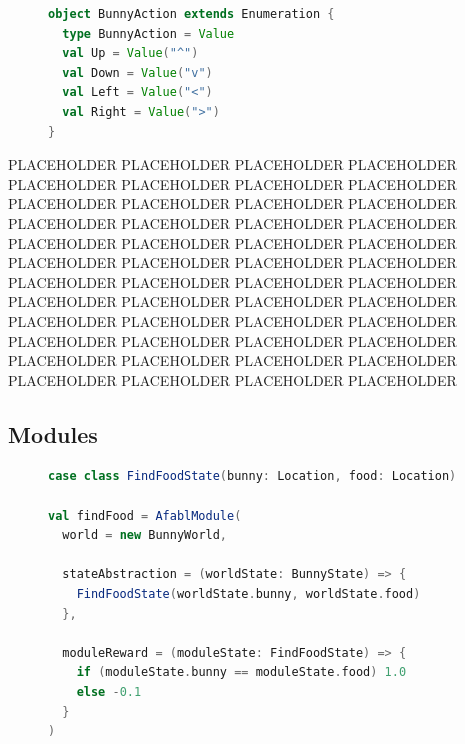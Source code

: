 \begin{figure}[ht]
\begin{center}

\begin{lstlisting}[language=Scala]
object BunnyAction extends Enumeration {
  type BunnyAction = Value
  val Up = Value("^")
  val Down = Value("v")
  val Left = Value("<")
  val Right = Value(">")
}
\end{lstlisting}

\caption{}
\end{center}
\label{fig:bunny-action-code}
\end{figure}


PLACEHOLDER PLACEHOLDER PLACEHOLDER PLACEHOLDER PLACEHOLDER PLACEHOLDER PLACEHOLDER PLACEHOLDER PLACEHOLDER PLACEHOLDER PLACEHOLDER PLACEHOLDER PLACEHOLDER PLACEHOLDER PLACEHOLDER PLACEHOLDER PLACEHOLDER PLACEHOLDER PLACEHOLDER PLACEHOLDER PLACEHOLDER PLACEHOLDER PLACEHOLDER PLACEHOLDER PLACEHOLDER PLACEHOLDER PLACEHOLDER PLACEHOLDER PLACEHOLDER PLACEHOLDER PLACEHOLDER PLACEHOLDER PLACEHOLDER PLACEHOLDER PLACEHOLDER PLACEHOLDER PLACEHOLDER PLACEHOLDER PLACEHOLDER PLACEHOLDER PLACEHOLDER PLACEHOLDER PLACEHOLDER PLACEHOLDER PLACEHOLDER PLACEHOLDER PLACEHOLDER PLACEHOLDER

\subsection{Modules}

\begin{figure}[ht]
\begin{center}

\begin{lstlisting}[language=Scala]
case class FindFoodState(bunny: Location, food: Location)

val findFood = AfablModule(
  world = new BunnyWorld,

  stateAbstraction = (worldState: BunnyState) => {
    FindFoodState(worldState.bunny, worldState.food)
  },

  moduleReward = (moduleState: FindFoodState) => {
    if (moduleState.bunny == moduleState.food) 1.0
    else -0.1
  }
)
\end{lstlisting}

\caption{}
\end{center}
\label{fig:find-food-code}
\end{figure}

